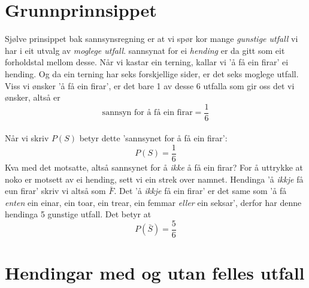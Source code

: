 



\section{Grunnprinnsippet}
Sjølve prinsippet bak sannsynsregning er at vi spør kor mange \textit{gunstige utfall}  vi har i eit utvalg av \textit{moglege utfall}. sannsynat for ei \textit{hending} er da gitt som eit forholdstal mellom desse. \regv
{} \vsk
Når vi kastar ein terning, kallar vi 'å få ein firar' ei hending. Og da ein terning har seks forskjellige sider, er det seks moglege utfall.
Viss vi ønsker 'å få ein firar', er det bare 1 av desse 6 utfalla som gir oss det vi ønsker, altså er
\[ \text{sannsyn for å få ein firar}=
 \frac{1}{6} \]
\qquad {} \\[5pt]
Når vi skriv $P(S)$ betyr dette 'sannsynet for å få ein firar':
\[ P(S)=\frac{1}{6} \]
Kva med det motsatte, altså sannsynet for å \textsl{ikke} å få ein firar? For å uttrykke at noko er motsett av ei hending, sett vi ein strek over namnet. Hendinga 'å \textsl{ikkje} få eun firar' skriv vi altså som $ \bar{F} $. Det 'å \textsl{ikkje} få ein firar' er det same som 'å få \textsl{enten} ein einar, ein toar, ein trear, ein femmar \textsl{eller} ein seksar', derfor har denne hendinga 5 gunstige utfall. Det betyr at
\[ P(\bar{S})=\frac{5}{6} \]
 \vsk

\section{Hendingar med og utan felles utfall}
